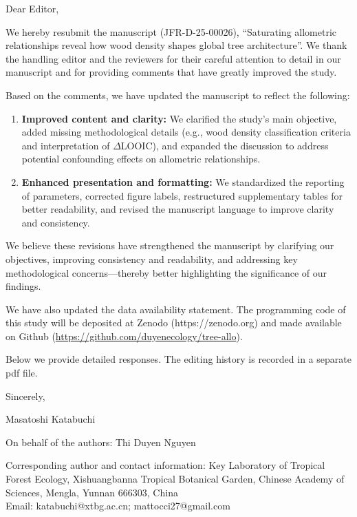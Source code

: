 \documentclass[
  12pt,
  letterpaper,
  DIV=11,
  numbers=noendperiod]{scrartcl}
\author{}
\date{2025-03-26}
\begin{document}
Dear Editor,

We hereby resubmit the manuscript (JFR-D-25-00026), ``Saturating
allometric relationships reveal how wood density shapes global tree
architecture''. We thank the handling editor and the reviewers for their
careful attention to detail in our manuscript and for providing comments
that have greatly improved the study.

Based on the comments, we have updated the manuscript to reflect the
following:

\begin{enumerate}
\def\labelenumi{\arabic{enumi}.}
\item
  \textbf{Improved content and clarity:} We clarified the study's main
  objective, added missing methodological details (e.g., wood density
  classification criteria and interpretation of \(\Delta\)LOOIC), and
  expanded the discussion to address potential confounding effects on
  allometric relationships.
\item
  \textbf{Enhanced presentation and formatting:} We standardized the
  reporting of parameters, corrected figure labels, restructured
  supplementary tables for better readability, and revised the
  manuscript language to improve clarity and consistency.
\end{enumerate}

We believe these revisions have strengthened the manuscript by
clarifying our objectives, improving consistency and readability, and
addressing key methodological concerns---thereby better highlighting the
significance of our findings.

We have also updated the data availability statement. The programming
code of this study will be deposited at Zenodo (https://zenodo.org) and
made available on Github
(\url{https://github.com/duyenecology/tree-allo}).

Below we provide detailed responses. The editing history is recorded in
a separate pdf file.

Sincerely,

Masatoshi Katabuchi

On behalf of the authors: Thi Duyen Nguyen

Corresponding author and contact information: Key Laboratory of Tropical
Forest Ecology, Xishuangbanna Tropical Botanical Garden, Chinese Academy
of Sciences, Mengla, Yunnan 666303, China\\
Email: katabuchi@xtbg.ac.cn; mattocci27@gmail.com

\newpage
\end{document}
